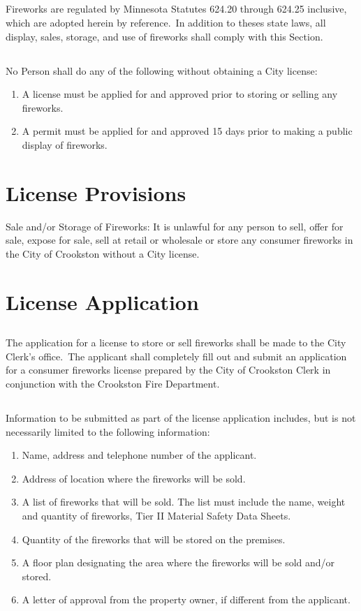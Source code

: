 \subsection{}
Fireworks are regulated by Minnesota Statutes 624.20 through 624.25 inclusive, which are adopted herein by reference. In addition to theses state laws, all display, sales, storage, and use of fireworks shall comply with this Section.
\subsection{}
No Person shall do any of the following without obtaining a City license:
\begin{enumerate}[{\indent}1)]
    \item A license must be applied for and approved prior to storing or selling any fireworks. 
    \item A permit must be applied for and approved 15 days prior to making a public display of fireworks. 
\end{enumerate}
\section{License Provisions}
Sale and/or Storage of Fireworks: It is unlawful for any person to sell, offer for sale, expose for sale, sell at retail or wholesale or store any consumer fireworks in the City of Crookston without a City license.
\section{License Application}
\subsection{}
The application for a license to store or sell fireworks shall be made to the City Clerk's office. The applicant shall completely fill out and submit an application for a consumer fireworks license prepared by the City of Crookston Clerk in conjunction with the Crookston Fire Department.  
\subsection{}
Information to be submitted as part of the license application includes, but is not necessarily limited to the following information:  
\begin{enumerate}[{\indent}1)]
    \item Name, address and telephone number of the applicant. 
    \item Address of location where the fireworks will be sold. 
    \item A list of fireworks that will be sold. The list must include the name, weight and quantity of fireworks, Tier II Material Safety Data Sheets. 
    \item Quantity of the fireworks that will be stored on the premises. 
    \item A floor plan designating the area where the fireworks will be sold and/or stored. 
    \item A letter of approval from the property owner, if different from the applicant. 
\end{enumerate}
